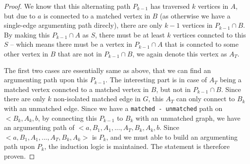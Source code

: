\documentclass[11pt]{article}
\newcommand{\ilc}{\texttt}
\begin{document}
\begin{proof}
We know that this alternating path $P_{k-1}$ has traversed $k$ vertices in $A$, but due to $a$ is connected to a matched vertex in $B$ (as otherwise we have a single-edge argumenting path direcly), there are only $k-1$ vertices in $P_{k-1} \cap B$. By making this $P_{k-1} \cap A$ as $S$, there must be at least $k$ vertices conncted to this $S$ -- which means there must be a vertex in $P_{k-1} \cap A$ that is conncted to some other vertex in $B$ that are not in $P_{k-1} \cap B$, we again denote this vertex as $A_T$.

The first two cases are essentially same as above, that we can find an argumenting path upon this $P_{k-1}$. The interesting part is in case of $A_T$ being a matched vertex conncted to a matched vertex in $B$, but not in $P_{k-1} \cap B$. Since there are only $k$ non-isolated matched edge in $G$, this $A_T$ can only connect to $B_k$ with an unmatched edge. Since we have a \ilc{matched - unmatched} path on $<B_k, A_k, b$, by connecting this $P_{k-1}$ to $B_k$ with an unmatched graph, we have an argumenting path of $<a, B_1, A_1, ..., A_T, B_k, A_k, b$. Since $<a, B_1, A_1, ..., A_T, B_k, A_k>$ is $P_k$, and we must able to build an argumenting path upon $P_k$, the induction logic is maintained. The statement is therefore proven.



%
%
%
%
%

\end{proof}


%
% 
% 
\end{document}

